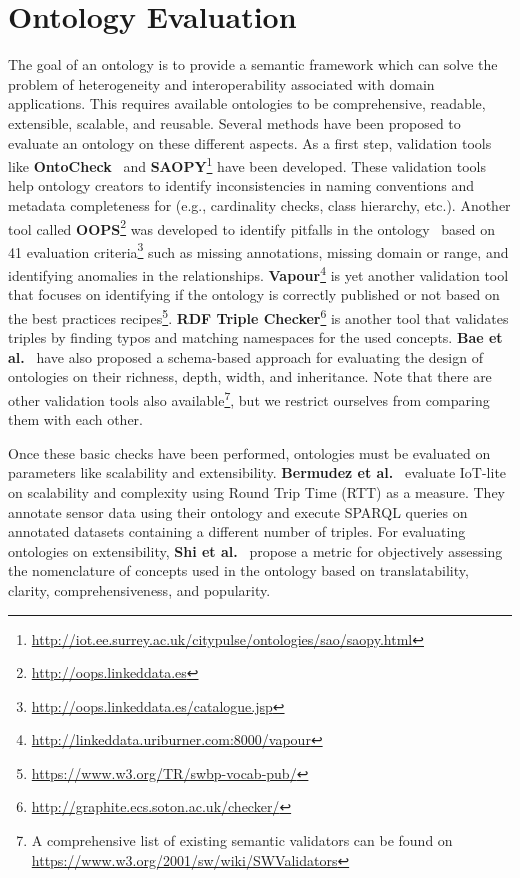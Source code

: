 \documentclass{elsart}  %
\begin{document}
\section{Ontology Evaluation}\label{sec:evaluation}
The goal of an ontology is to provide a semantic framework which can solve the problem of heterogeneity and interoperability associated with domain applications. This requires available ontologies to be comprehensive, readable, extensible, scalable, and reusable. Several methods have been proposed to evaluate an ontology on these different aspects. As a first step, validation tools like \textbf{OntoCheck}~\cite{schober2012ontocheck} and \textbf{SAOPY}\footnote{\url{http://iot.ee.surrey.ac.uk/citypulse/ontologies/sao/saopy.html}} have been developed. These validation tools help ontology creators to identify inconsistencies in naming conventions and metadata completeness for (e.g., cardinality checks, class hierarchy, etc.). Another tool called \textbf{OOPS}\footnote{\url{http://oops.linkeddata.es}} was developed to identify pitfalls in the ontology~\cite{oops} based on 41 evaluation criteria\footnote{\url{http://oops.linkeddata.es/catalogue.jsp}} such as missing annotations, missing domain or range, and identifying anomalies in the relationships. \textbf{Vapour}\footnote{\url{http://linkeddata.uriburner.com:8000/vapour}} is yet another validation tool that focuses on identifying if the ontology is correctly published or not based on the best practices recipes\footnote{\url{https://www.w3.org/TR/swbp-vocab-pub/}}. \textbf{RDF Triple Checker}\footnote{\url{http://graphite.ecs.soton.ac.uk/checker/}} is another tool that validates triples by finding typos and matching namespaces for the used concepts. \textbf{Bae et al.}~\cite{Bae201432} have also proposed a schema-based approach for evaluating the design of ontologies on their richness, depth, width, and inheritance. Note that there are other validation tools also available\footnote{A comprehensive list of existing semantic validators can be found on \url{https://www.w3.org/2001/sw/wiki/SWValidators}}, but we restrict ourselves from comparing them with each other.
\par 
Once these basic checks have been performed, ontologies must be evaluated on parameters like scalability and extensibility. \textbf{Bermudez et al.}~\cite{bermudez2016iot,BermudezEdo2017} evaluate IoT-lite on scalability and complexity using Round Trip Time (RTT) as a measure. They annotate sensor data using their ontology and execute SPARQL queries on annotated datasets containing a different number of triples. For evaluating ontologies on extensibility, \textbf{Shi et al.}~\cite{shi2012sensor} propose a metric for objectively assessing the nomenclature of concepts used in the ontology based on translatability, clarity, comprehensiveness, and popularity.
\end{document}
